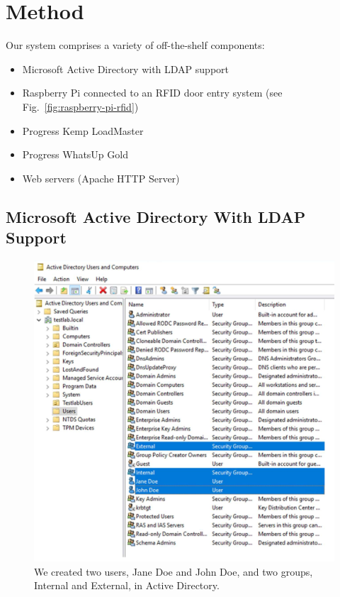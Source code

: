 \section{Method}\label{sec:method}

Our system comprises a variety of off-the-shelf components:

\begin{itemize}
\item Microsoft Active Directory with LDAP support
\item Raspberry Pi connected to an RFID door entry system (see
  Fig.~\ref{fig:raspberry-pi-rfid})
\item Progress Kemp LoadMaster
\item Progress WhatsUp Gold
\item Web servers (Apache HTTP Server)
\end{itemize}

\subsection{Microsoft Active Directory With LDAP Support}

\begin{figure}
  \centerline{\includegraphics[width=\columnwidth]{img/active-directory}}
  \caption{We created two users, Jane Doe and John Doe, and two
    groups, Internal and External, in Active
    Directory.}\label{fig:active-directory}
\end{figure}

